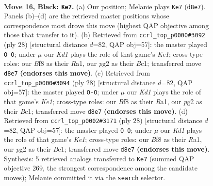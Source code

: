 \documentclass[11pt]{article}
\begin{document}
\clearpage

\begin{figure}[p]\centering
\begin{subfigure}{0.46\textwidth}\centering
\resizebox{\linewidth}{!}{%
\newchessgame
\chessboard[
  setfen={rnqk1b1r/p4pp1/5n1p/2P2p1P/B2P1P2/8/6P1/R1BQK1NR b KQ - 0 16},
  showmover=false,
  pgfstyle=straightmove, color=movearrow, markmove={d8-e7}
]}
\caption{}
\end{subfigure}\hfill
\begin{subfigure}{0.46\textwidth}\centering
\resizebox{\linewidth}{!}{%
\newchessgame
\chessboard[
  setfen={rn1qk2r/pp2b2p/6p1/1N1p4/4p3/8/PP2QPPP/R1B1K2R w KQkq - 0 15},
  showmover=false,
  pgfstyle=straightmove, color=movearrow, markmove={e1-g1}
]}
\caption{}
\end{subfigure}
\\[4pt]
\begin{subfigure}{0.46\textwidth}\centering
\resizebox{\linewidth}{!}{%
\newchessgame
\chessboard[
  setfen={rn1qk2r/pp2b2p/6p1/1N1p4/4p3/8/PP2QPPP/R1B1K2R w KQkq - 0 15},
  showmover=false,
  pgfstyle=straightmove, color=movearrow, markmove={e1-g1}
]}
\caption{}
\end{subfigure}\hfill
\begin{subfigure}{0.46\textwidth}\centering
\resizebox{\linewidth}{!}{%
\newchessgame
\chessboard[
  setfen={rn1qk2r/pp2b2p/6p1/1N1p4/4p3/8/PP2QPPP/R1B1K2R w KQkq - 0 15},
  showmover=false,
  pgfstyle=straightmove, color=movearrow, markmove={e1-g1}
]}
\caption{}
\end{subfigure}
\caption{\textbf{Move 16, Black: \texttt{Ke7}.} (a) Our position; Melanie plays \texttt{Ke7} (\texttt{d8e7}). Panels (b)--(d) are the retrieved master positions whose correspondence most drove this move (highest QAP objective among those that transfer to it). (b) Retrieved from \texttt{ccrl\_top\_p0000\#3092} (ply 28) [structural distance $d$=82, QAP obj=57]: the master played \texttt{O-O}; under $\mu$ our \emph{Kd1} plays the role of that game's \emph{Ke1}; cross-type roles: our \emph{B}f8 as their \emph{R}a1, our \emph{p}g2 as their \emph{B}c1; transferred move \texttt{d8e7} \textbf{(endorses this move)}. (c) Retrieved from \texttt{ccrl\_top\_p0000\#3094} (ply 28) [structural distance $d$=82, QAP obj=57]: the master played \texttt{O-O}; under $\mu$ our \emph{Kd1} plays the role of that game's \emph{Ke1}; cross-type roles: our \emph{B}f8 as their \emph{R}a1, our \emph{p}g2 as their \emph{B}c1; transferred move \texttt{d8e7} \textbf{(endorses this move)}. (d) Retrieved from \texttt{ccrl\_top\_p0002\#3171} (ply 28) [structural distance $d$=82, QAP obj=57]: the master played \texttt{O-O}; under $\mu$ our \emph{Kd1} plays the role of that game's \emph{Ke1}; cross-type roles: our \emph{B}f8 as their \emph{R}a1, our \emph{p}g2 as their \emph{B}c1; transferred move \texttt{d8e7} \textbf{(endorses this move)}. Synthesis: 5 retrieved analogs transferred to \texttt{Ke7} (summed QAP objective 269, the strongest correspondence among the candidate moves); Melanie committed it via the \texttt{search} selector.}
\label{fig:thought-m31}
\end{figure}
\end{document}
